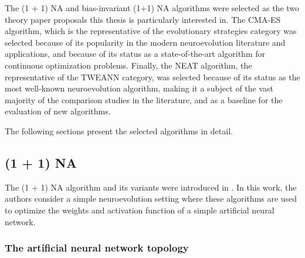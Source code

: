 The (1 + 1) NA and bias-invariant (1+1) NA algorithms were selected as the two theory paper proposals this thesis is particularly interested in.
The CMA-ES algorithm, which is the representative of the evolutionary strategies category was selected because of its popularity in the modern neuroevolution literature
and applications, and because of its status as a state-of-the-art algorithm for continuous optimization problems.
Finally, the NEAT algorithm, the representative of the TWEANN category, was selected because of its status as the most well-known neuroevolution algorithm, making
it a subject of the vast majority of the comparison studies in the literature, and as a baseline for the evaluation of new algorithms.

The following sections present the selected algorithms in detail.

\subsection{(1 + 1) NA}

The (1 + 1) NA algorithm and its variants were introduced in \cite{na}.
In this work, the authors consider a simple neuroevolution setting where these algorithms are used to optimize the weights and activation function of
a simple artificial neural network.

\subsubsection{The artificial neural network topology}

